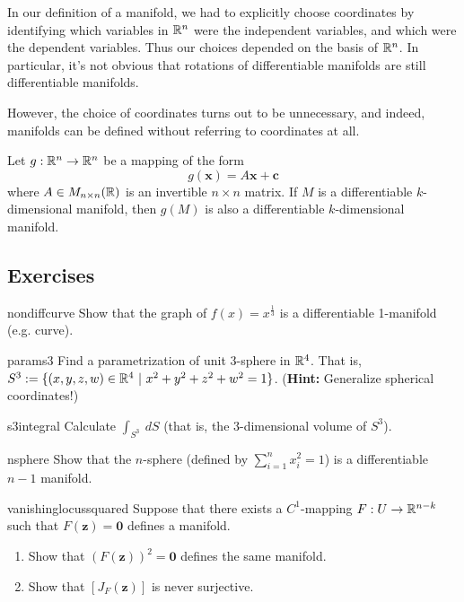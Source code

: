 In our definition of a manifold, we had to explicitly choose coordinates by identifying which variables in $\mathbb{R}^n$ were the independent variables, and which were the dependent variables.  Thus our choices depended on the basis of $\mathbb{R}^n$.  In particular, it's not obvious that rotations of differentiable manifolds are still differentiable manifolds.

However, the choice of coordinates turns out to be unnecessary, and indeed, manifolds can be defined without referring to coordinates at all.

\begin{corollary}\label{mfdindependence}
Let $g : \mathbb{R}^n \to \mathbb{R}^n$ be a mapping of the form $$g(\bm{x}) = A\bm{x} + \bm{c}$$
where $A \in M_{n \times n}(\mathbb{R})$ is an invertible $n \times n$ matrix.  If $M$ is a differentiable $k$-dimensional manifold, then $g(M)$ is also a differentiable $k$-dimensional manifold.
\end{corollary}









\subsection{Exercises}

\begin{problem}{nondiffcurve}
    Show that the graph of $f(x) = x^{\frac{1}{3}}$ is a differentiable 1-manifold (e.g. curve).
\end{problem}

\begin{problem}{params3}
    Find a parametrization of unit $3$-sphere in $\mathbb{R}^{4}$.  That is, $S^3 := \{(x,y,z,w) \in \mathbb{R}^4 \ | \ x^2+y^2 + z^2 + w^2 = 1\}$. (\textbf{Hint:} Generalize spherical coordinates!) 
\end{problem}

\begin{problem}{s3integral}
   Calculate $\int_{S^3} \ dS$ (that is, the 3-dimensional volume of $S^3$). 
\end{problem}

\begin{problem}{nsphere}
    Show that the $n$-sphere (defined by $\sum_{i=1}^n x_i^2 = 1$) is a differentiable $n-1$ manifold.
\end{problem}

\begin{problem}{vanishinglocussquared}
    Suppose that there exists a $C^1$-mapping $F : U \to \mathbb{R}^{n-k}$ such that $F(\bm{z}) = \bm{0}$ defines a manifold.  
\begin{enumerate}[label=(\alph*)]
    \item Show that $(F(\bm{z}))^2 = \bm{0}$ defines the same manifold.
    \item Show that $[J_F(\bm{z})]$ is never surjective.
\end{enumerate}
\end{problem}

